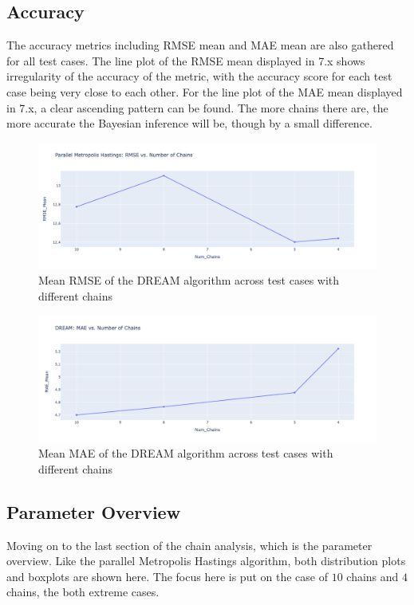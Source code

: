 \subsection{Accuracy}
The accuracy metrics including RMSE mean and MAE mean are also gathered for all test cases. The line plot of the RMSE mean displayed in 7.x shows irregularity of the accuracy of the metric, with the accuracy score for each test case being very close to each other. For the line plot of the MAE mean displayed in 7.x, a clear ascending pattern can be found. The more chains there are, the more accurate the Bayesian inference will be, though by a small difference.
\begin{figure}[H]
    \centering
    \includegraphics[width=1\textwidth]{figures/dream/rmse.png}
    \captionsetup{width=.8\textwidth}
    \caption{Mean RMSE of the DREAM algorithm across test cases with different chains}
    \label{fig:enter-label}
\end{figure}

\begin{figure}[H]
    \centering
    \includegraphics[width=1\textwidth]{figures/dream/mae.png}
    \captionsetup{width=.8\textwidth}
    \caption{Mean MAE of the DREAM algorithm across test cases with different chains}
    \label{fig:enter-label}
\end{figure}

\subsection{Parameter Overview}
Moving on to the last section of the chain analysis, which is the parameter overview. Like the parallel Metropolis Hastings algorithm, both distribution plots and boxplots are shown here. The focus here is put on the case of $10$ chains and $4$ chains, the both extreme cases. 

